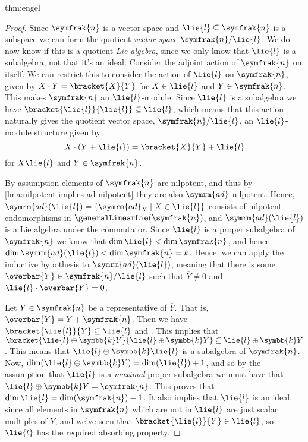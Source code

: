 \documentclass[fleqn]{NotesClass}
\renewcommand{\field}{\symbb{k}}
\newcommand{\ad}{\symrm{ad}}
\newcommand{\nilpotentLie}{\symfrak{n}}
\begin{document}
\begin{thm}{}{thm:engel}
\begin{proof}
            Since \(\nilpotentLie\) is a vector space and \(\lie{l} \subseteq \nilpotentLie\) is a subspace we can form the quotient \emph{vector space} \(\nilpotentLie/\lie{l}\).
            We do now know if this is a quotient \emph{Lie algebra}, since we only know that \(\lie{l}\) is a subalgebra, not that it's an ideal.
            Consider the adjoint action of \(\nilpotentLie\) on itself.
            We can restrict this to consider the action of \(\lie{l}\) on \(\nilpotentLie\), given by \(X \cdot Y = \bracket{X}{Y}\) for \(X \in \lie{l}\) and \(Y \in \nilpotentLie\).
            This makes \(\nilpotentLie\) an \(\lie{l}\)-module.
            Since \(\lie{l}\) is a subalgebra we have \(\bracket{\lie{l}}{\lie{l}} \subseteq \lie{l}\), which means that this action naturally gives the quotient vector space, \(\nilpotentLie/\lie{l}\), an \(\lie{l}\)-module structure given by
            \begin{equation}
                X \cdot (Y + \lie{l}) = \bracket{X}{Y} + \lie{l}
            \end{equation}
            for \(X \lie{l}\) and \(Y \in \nilpotentLie\).
            
            By assumption elements of \(\nilpotentLie\) are nilpotent, and thus by \cref{lma:nilpotent implies ad-nilpotent} they are also \(\ad\)-nilpotent.
            Hence, \(\ad(\lie{l}) = \{\ad_X \mid X \in \lie{l}\}\) consists of nilpotent endomorphisms in \(\generalLinearLie(\nilpotentLie)\), and \(\ad(\lie{l})\) is a Lie algebra under the commutator.
            Since \(\lie{l}\) is a proper subalgebra of \(\nilpotentLie\) we know that \(\dim \lie{l} < \dim \nilpotentLie\), and hence \(\dim \ad(\lie{l}) < \dim \nilpotentLie = k\).
            Hence, we can apply the inductive hypothesis to \(\ad(\lie{l})\), meaning that there is some \(\overbar{Y} \in \nilpotentLie/\lie{l}\) such that \(\overbar{Y} \ne 0\) and \(\lie{l} \cdot \overbar{Y} = 0\).
            
            Let \(Y \in \nilpotentLie\) be a representative of \(\overbar{Y}\).
            That is, \(\overbar{Y} = Y + \nilpotentLie\).
            Then we have \(\bracket{\lie{l}}{Y} \subseteq \lie{l}\) and \(\).
            This implies that \(\bracket{\lie{l} \oplus \field Y}{\lie{l} \oplus \field Y} \subseteq \lie{l} \oplus \field Y\).
            This means that \(\lie{l} \oplus \field \lie{l}\) is a subalgebra of \(\nilpotentLie\).
            Now, \(\dim(\lie{l} \oplus \field Y) = \dim(\lie{l}) + 1\), and so by the assumption that \(\lie{l}\) is a \emph{maximal} proper subalgebra we must have that \(\lie{l} \oplus \field Y = \nilpotentLie\).
            This proves that \(\dim \lie{l} = \dim(\nilpotentLie) - 1\).
            It also implies that \(\lie{l}\) is an ideal, since all elements in \(\nilpotentLie\) which are not in \(\lie{l}\) are just scalar multiples of \(Y\), and we've seen that \(\bracket{\lie{l}}{Y} \in \lie{l}\), so \(\lie{l}\) has the required absorbing property.
            

\end{proof}
\end{thm}
\end{document}
